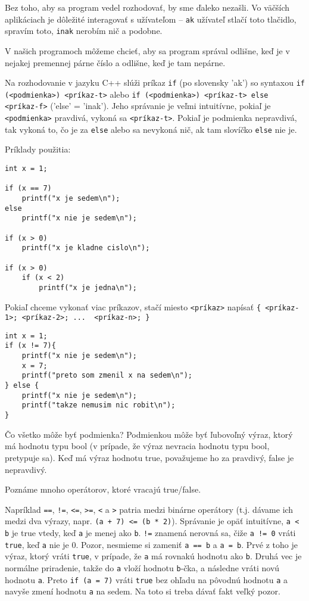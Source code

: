 
Bez toho, aby sa program vedel rozhodovať, by sme ďaleko nezašli. Vo väčších
aplikáciach je dôležité interagovať s užívateľom -- \verb!ak! užívateľ stlačí
toto tlačidlo, spravím toto, \verb!inak!  nerobím nič a podobne. 

V našich programoch môžeme chcieť, aby sa program správal odlišne, keď je v
nejakej premennej párne číslo a odlišne, keď je tam nepárne.

Na rozhodovanie v jazyku C++ slúži príkaz \verb!if! (po slovensky 'ak') so
syntaxou \verb!if (<podmienka>) <príkaz-t>! alebo \verb!if (<podmienka>) <príkaz-t> else <príkaz-f>!
('else' = 'inak'). Jeho správanie je veľmi intuitívne, pokiaľ je
\verb!<podmienka>! pravdivá, vykoná sa \verb!<príkaz-t>!.  Pokiaľ je podmienka
nepravdivá, tak vykoná to, čo je za \verb!else! alebo sa nevykoná nič, ak tam
slovíčko \verb!else! nie je.

Príklady použitia:
\begin{lstlisting}
int x = 1;

if (x == 7) 
    printf("x je sedem\n");
else
    printf("x nie je sedem\n");

if (x > 0)
    printf("x je kladne cislo\n");

if (x > 0)
    if (x < 2)
        printf("x je jedna\n");
\end{lstlisting}

Pokiaľ chceme vykonať viac príkazov, stačí miesto \verb!<príkaz>! napísať \verb!{ <príkaz-1>; <príkaz-2>; ...  <príkaz-n>; }!
\begin{lstlisting}
int x = 1;
if (x != 7){
    printf("x nie je sedem\n");
    x = 7;
    printf("preto som zmenil x na sedem\n");
} else {
    printf("x nie je sedem\n");
    printf("takze nemusim nic robit\n");
}
\end{lstlisting}

\medskip

Čo všetko môže byť podmienka? Podmienkou môže byť ľubovoľný výraz, ktorý má
hodnotu typu bool (v prípade, že výraz nevracia hodnotu typu bool, pretypuje sa).  Keď má výraz
hodnotu true, považujeme ho za pravdivý, false je nepravdivý.

Poznáme mnoho operátorov, ktoré vracajú true/false. 

Napríklad \verb'==', \verb'!=', \verb'<=', \verb'>=', \verb'<' a \verb'>' patria medzi binárne
operátory (t.j. dávame ich medzi dva výrazy, napr. \verb!(a + 7) <= (b * 2)!).
Správanie je opäť intuitívne, \verb'a < b' je true vtedy, keď \verb!a! je menej ako
\verb!b!.  \verb'!=' znamená nerovná sa, čiže \verb'a != 0' vráti \verb!true!, keď
\verb!a! nie je 0. Pozor, nesmieme si zameniť \verb'a == b' a \verb'a = b'.  Prvé z
toho je výraz, ktorý vráti \verb!true!, v prípade, že \verb!a! má rovnakú hodnotu
ako \verb!b!. Druhá vec je normálne priradenie, takže do \verb!a! vloží hodnotu \verb!b!-čka,
a následne vráti novú hodnotu \verb!a!. Preto \verb!if (a = 7)! vráti \verb!true!
bez ohľadu na pôvodnú hodnotu \verb!a! a navyše zmení hodnotu \verb!a! na sedem.  Na toto
si treba dávať fakt veľký pozor. 

